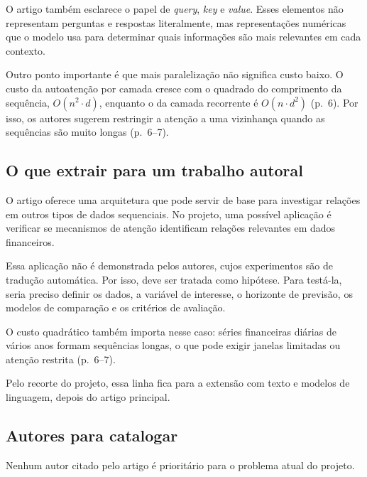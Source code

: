 O artigo também esclarece o papel de \emph{query}, \emph{key} e \emph{value}. Esses elementos não representam perguntas e respostas literalmente, mas representações numéricas que o modelo usa para determinar quais informações são mais relevantes em cada contexto.

Outro ponto importante é que mais paralelização não significa custo baixo. O custo da autoatenção por camada cresce com o quadrado do comprimento da sequência, $O(n^2 \cdot d)$, enquanto o da camada recorrente é $O(n \cdot d^2)$ (p.~6). Por isso, os autores sugerem restringir a atenção a uma vizinhança quando as sequências são muito longas (p.~6--7).

\subsection*{O que extrair para um trabalho autoral}

O artigo oferece uma arquitetura que pode servir de base para investigar relações em outros tipos de dados sequenciais. No projeto, uma possível aplicação é verificar se mecanismos de atenção identificam relações relevantes em dados financeiros.

Essa aplicação não é demonstrada pelos autores, cujos experimentos são de tradução automática. Por isso, deve ser tratada como hipótese. Para testá-la, seria preciso definir os dados, a variável de interesse, o horizonte de previsão, os modelos de comparação e os critérios de avaliação.

O custo quadrático também importa nesse caso: séries financeiras diárias de vários anos formam sequências longas, o que pode exigir janelas limitadas ou atenção restrita (p.~6--7).

Pelo recorte do projeto, essa linha fica para a extensão com texto e modelos de linguagem, depois do artigo principal.

\subsection*{Autores para catalogar}

Nenhum autor citado pelo artigo é prioritário para o
problema atual do projeto.